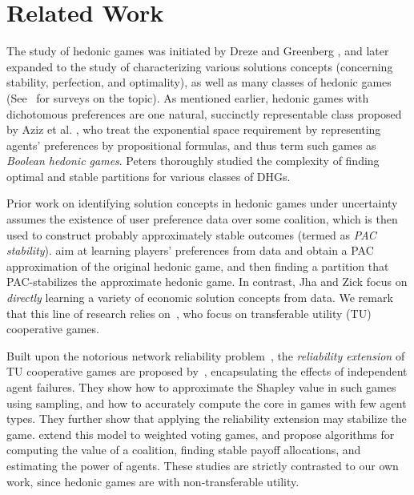 \documentclass[letterpaper]{article} %
\begin{document}
\section{Related Work}
\label{sec:Related Work}
The study of hedonic games was initiated by Dreze and Greenberg , and later expanded to the study of characterizing various solutions concepts (concerning stability, perfection, and optimality), as well as many classes of hedonic games (See~\cite{aziz_savani_moulin_2016,woeginger2013core} for surveys on the topic). As mentioned earlier, hedonic games with dichotomous preferences are one natural, succinctly representable class proposed by Aziz et al. , %
who treat the exponential space requirement by representing agents’ preferences by propositional formulas, and thus term such games as \textit{Boolean hedonic games}. %
Peters  thoroughly studied the complexity of finding optimal and stable partitions for various classes of DHGs.
%

Prior work on identifying solution concepts in hedonic games under uncertainty assumes the existence of user preference data over some coalition, which is then used to construct probably approximately stable outcomes (termed as \textit{PAC stability}). \cite{sliwinski2017learning,igarashi2019forming} aim at learning players' preferences from data and obtain a PAC approximation of the original hedonic game, and then finding a partition that PAC-stabilizes the approximate hedonic game. In contrast, Jha and Zick  focus on \textit{directly} learning a variety of economic solution concepts from data. We remark that this line of research relies on~\cite{balcan2015learning}, who focus on transferable utility (TU) cooperative games.
%

Built upon the notorious network reliability problem~\cite{provan1983complexity}, the \textit{reliability extension} of TU cooperative games are proposed by~\cite{bachrach2011solving,bachrach2012agent}, encapsulating the effects of independent agent failures. They show how to approximate the Shapley value in such games using sampling, and how to accurately compute the core in games with few agent types. They further show that applying the reliability extension may stabilize the game. \cite{bachrach2013reliability} extend this model to weighted voting games, and propose algorithms for computing the value of a coalition, finding stable payoff allocations, and estimating the power of agents. These studies are strictly contrasted to our own work, since hedonic games are with non-transferable utility. 
%
\end{document}
